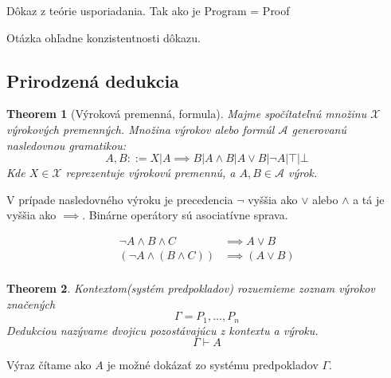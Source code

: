 \documentclass[a4paper,10pt,oneside]{report}%
\newtheorem{theorem}{Theorem}
\begin{document}
Dôkaz z teórie usporiadania. Tak ako je Program = Proof

Otázka ohľadne konzistentnosti dôkazu.

\subsection{Prirodzená dedukcia}

\begin{theorem}[Výroková premenná, formula]
    Majme spočítateľnú množinu $\mathcal{X}$ výrokových premenných. Množina výrokov
    alebo formúl $\mathcal{A}$ generovanú nasledovnou gramatikou:
    \begin{equation}
        A, B ::= X | A \implies B | A \wedge B | A \vee B | \neg A | \top | \bot
    \end{equation}
    Kde $X \in \mathcal{X}$ reprezentuje výrokovú premennú, a $A, B \in \mathcal{A}$
    výrok.
\end{theorem}

V prípade nasledovného výroku je precedencia $\neg$ vyššia ako $\vee$ alebo $\wedge$
a tá je vyššia ako $\implies$. Binárne operátory sú asociatívne sprava.

\begin{align*}
    \neg A \wedge B \wedge C &\implies A \vee B \\
    (\neg A \wedge (B \wedge C)) &\implies (A \vee B) \\
\end{align*}

\begin{theorem}
    Kontextom(systém predpokladov) rozuemieme zoznam výrokov značených
    \begin{equation}
        \Gamma = P_{1}, \dots , P_{n}
    \end{equation}
    Dedukciou nazývame dvojicu pozostávajúcu z kontextu a výroku.
    \begin{equation}
        \Gamma \vdash A
    \end{equation}
\end{theorem}

Výraz čítame ako $A$ je možné dokázať zo systému predpokladov $\Gamma$.
\end{document}
